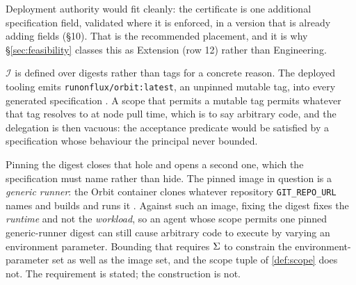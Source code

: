 Deployment authority would fit  cleanly: the certificate is one additional specification
field, validated where it is enforced, in a version that is already adding fields (\S10). That is the
recommended placement, and it is why \S\ref{sec:feasibility} classes this as Extension (row 12) rather than Engineering.

\begin{remark}
\label{rem:digest}
$\mathcal{I}$ is defined over digests rather than tags for a concrete reason. The deployed tooling
emits \texttt{runonflux/\allowbreak{}orbit:latest}, an unpinned mutable tag, into every generated specification
. A scope that permits
a mutable tag permits whatever that tag resolves to at node pull time, which is to say arbitrary
code, and the delegation is then vacuous: the acceptance predicate would be satisfied by a
specification whose behaviour the principal never bounded.

Pinning the digest closes that hole and opens a second one, which the specification must name rather
than hide. The pinned image in question is a \emph{generic runner}: the Orbit container clones
whatever repository \texttt{GIT\_REPO\_URL} names and builds and runs it
. Against such an image, fixing the digest fixes the
\emph{runtime} and not the \emph{workload}, so an agent whose scope permits one pinned generic-runner
digest can still cause arbitrary code to execute by varying an environment parameter. Bounding that
requires $\Sigma$ to constrain the environment-parameter set as well as the image set, and the
scope tuple of \cref{def:scope} does not. The requirement is stated; the construction is not.
\end{remark}

